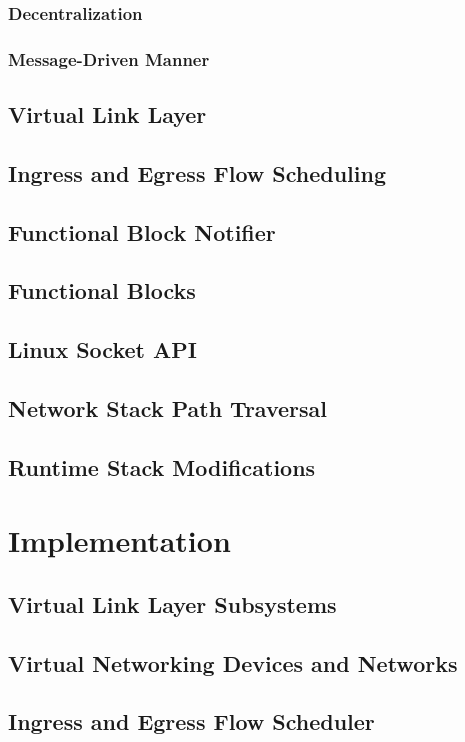 \subsection{Decentralization}
\subsection{Message-Driven Manner}
\section{Virtual Link Layer}
\section{Ingress and Egress Flow Scheduling}
\section{Functional Block Notifier}
\section{Functional Blocks}
\section{Linux Socket API}
\section{Network Stack Path Traversal}
\section{Runtime Stack Modifications}

\chapter{\label{chp:content} Implementation}
\section{Virtual Link Layer Subsystems}
\section{Virtual Networking Devices and Networks}
\section{Ingress and Egress Flow Scheduler}
